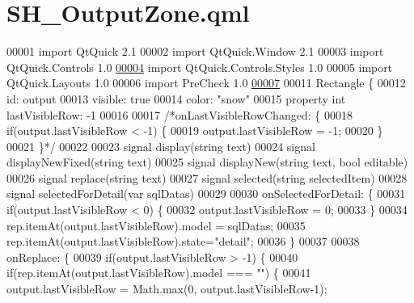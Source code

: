 \hypertarget{SH__OutputZone_8qml}{\section{S\-H\-\_\-\-Output\-Zone.\-qml}
\label{SH__OutputZone_8qml}
}

\begin{DoxyCode}
00001 \textcolor{keyword}{import} QtQuick 2.1
00002 import QtQuick.Window 2.1
00003 import QtQuick.Controls 1.0
\hypertarget{SH__OutputZone_8qml_source_l00004}{}\hyperlink{classSH__OutputZone}{00004} import QtQuick.Controls.Styles 1.0
00005 import QtQuick.Layouts 1.0
00006 import PreCheck 1.0
\hypertarget{SH__OutputZone_8qml_source_l00007}{}\hyperlink{classSH__OutputZone_ae324bcdd20ad4a9e435678d045964dc9}{00007} 
00011 Rectangle \{
00012     \textcolor{keywordtype}{id}: output
00013     visible: \textcolor{keyword}{true}
00014     color: \textcolor{stringliteral}{"snow"}
00015     \textcolor{keyword}{property} \textcolor{keywordtype}{int} lastVisibleRow: -1
00016 
00017     \textcolor{comment}{/*onLastVisibleRowChanged: \{}
00018 \textcolor{comment}{        if(output.lastVisibleRow < -1) \{}
00019 \textcolor{comment}{            output.lastVisibleRow = -1;}
00020 \textcolor{comment}{        \}}
00021 \textcolor{comment}{    \}*/}
00022 
00023     signal display(\textcolor{keywordtype}{string} text)
00024     signal displayNewFixed(\textcolor{keywordtype}{string} text)
00025     signal displayNew(\textcolor{keywordtype}{string} text, \textcolor{keywordtype}{bool} editable)
00026     signal replace(\textcolor{keywordtype}{string} text)
00027     signal selected(\textcolor{keywordtype}{string} selectedItem)
00028     signal selectedForDetail(var sqlDatas)
00029 
00030     onSelectedForDetail: \{
00031         \textcolor{keywordflow}{if}(output.lastVisibleRow < 0) \{
00032             output.lastVisibleRow = 0;
00033         \}
00034         rep.itemAt(output.lastVisibleRow).model = sqlDatas;
00035         rep.itemAt(output.lastVisibleRow).state=\textcolor{stringliteral}{"detail"};
00036     \}
00037 
00038     onReplace: \{
00039         \textcolor{keywordflow}{if}(output.lastVisibleRow > -1) \{
00040             \textcolor{keywordflow}{if}(rep.itemAt(output.lastVisibleRow).model === \textcolor{stringliteral}{""}) \{
00041                 output.lastVisibleRow = Math.max(0, output.lastVisibleRow-1);

\end{DoxyCode}
